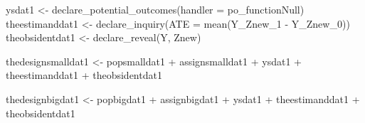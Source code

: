 \documentclass[
  12pt,
]{book}
\newenvironment{Shaded}{\begin{snugshade}}{\end{snugshade}}
\newcommand{\AttributeTok}[1]{\textcolor[rgb]{0.77,0.63,0.00}{#1}}
\newcommand{\FunctionTok}[1]{\textcolor[rgb]{0.00,0.00,0.00}{#1}}
\newcommand{\NormalTok}[1]{#1}
\newcommand{\OtherTok}[1]{\textcolor[rgb]{0.56,0.35,0.01}{#1}}
\newcommand{\SpecialCharTok}[1]{\textcolor[rgb]{0.00,0.00,0.00}{#1}}
\theoremstyle{definition}
\theoremstyle{definition}
\theoremstyle{definition}
\theoremstyle{remark}
\begin{document}
\begin{Shaded}
\begin{Highlighting}[]
\NormalTok{ysdat1 }\OtherTok{\textless{}{-}} \FunctionTok{declare\_potential\_outcomes}\NormalTok{(}\AttributeTok{handler =}\NormalTok{ po\_functionNull)}
\NormalTok{theestimanddat1 }\OtherTok{\textless{}{-}} \FunctionTok{declare\_inquiry}\NormalTok{(}\AttributeTok{ATE =} \FunctionTok{mean}\NormalTok{(Y\_Znew\_1 }\SpecialCharTok{{-}}\NormalTok{ Y\_Znew\_0))}
\NormalTok{theobsidentdat1 }\OtherTok{\textless{}{-}} \FunctionTok{declare\_reveal}\NormalTok{(Y, Znew)}

\NormalTok{thedesignsmalldat1 }\OtherTok{\textless{}{-}}\NormalTok{ popsmalldat1 }\SpecialCharTok{+}\NormalTok{ assignsmalldat1 }\SpecialCharTok{+}\NormalTok{ ysdat1 }\SpecialCharTok{+}\NormalTok{ theestimanddat1 }\SpecialCharTok{+}
\NormalTok{  theobsidentdat1}

\NormalTok{thedesignbigdat1 }\OtherTok{\textless{}{-}}\NormalTok{ popbigdat1 }\SpecialCharTok{+}\NormalTok{ assignbigdat1 }\SpecialCharTok{+}\NormalTok{ ysdat1 }\SpecialCharTok{+}\NormalTok{ theestimanddat1 }\SpecialCharTok{+}
\NormalTok{  theobsidentdat1}
\end{Highlighting}
\end{Shaded}
\end{document}
